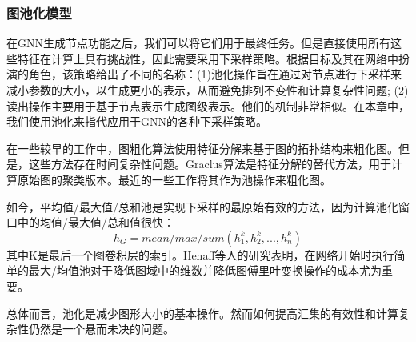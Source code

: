 \subsubsection{图池化模型}
在GNN生成节点功能之后，我们可以将它们用于最终任务。但是直接使用所有这些特征在计算上具有挑战性，因此需要采用下采样策略。根据目标及其在网络中扮演的角色，该策略给出了不同的名称：(1)池化操作旨在通过对节点进行下采样来减小参数的大小，以生成更小的表示，从而避免排列不变性和计算复杂性问题; (2)读出操作主要用于基于节点表示生成图级表示。他们的机制非常相似。在本章中，我们使用池化来指代应用于GNN的各种下采样策略。

在一些较早的工作中，图粗化算法使用特征分解来基于图的拓扑结构来粗化图。但是，这些方法存在时间复杂性问题。Graclus算法是特征分解的替代方法，用于计算原始图的聚类版本。最近的一些工作将其作为池操作来粗化图。

如今，平均值/最大值/总和池是实现下采样的最原始有效的方法，因为计算池化窗口中的均值/最大值/总和值很快：
\[
h_G=mean/max/sum(h_1^{k},h_2^{k},...,h_n^{k})
\]
其中K是最后一个图卷积层的索引。Henaff等人的研究\cite{henaff2015deep}表明，在网络开始时执行简单的最大/均值池对于降低图域中的维数并降低图傅里叶变换操作的成本尤为重要。

总体而言，池化是减少图形大小的基本操作。然而如何提高汇集的有效性和计算复杂性仍然是一个悬而未决的问题。
